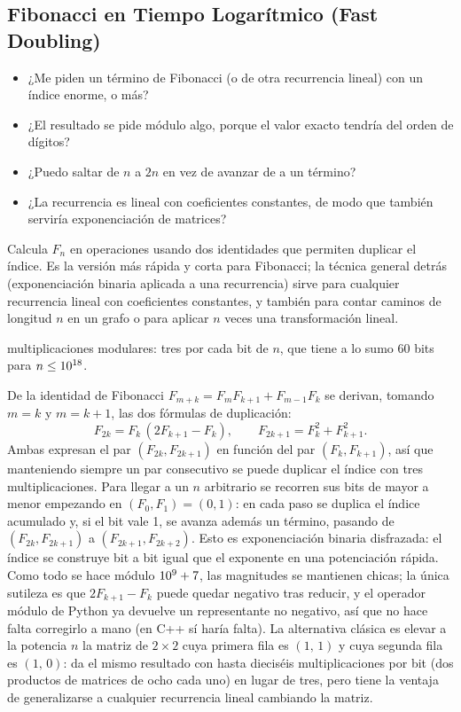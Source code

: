 \subsection{Fibonacci en Tiempo Logarítmico (Fast Doubling)}
\label{alg:7-8}


\begin{itemize}
\item ¿Me piden un término de Fibonacci (o de otra recurrencia lineal) con un índice enorme,  o más?
\item ¿El resultado se pide módulo algo, porque el valor exacto tendría del orden de  dígitos?
\item ¿Puedo saltar de $n$ a $2n$ en vez de avanzar de a un término?
\item ¿La recurrencia es lineal con coeficientes constantes, de modo que también serviría exponenciación de matrices?
\end{itemize}

 Calcula $F_n$ en  operaciones usando dos identidades que permiten duplicar el índice. Es la versión más rápida y corta para Fibonacci; la técnica general detrás (exponenciación binaria aplicada a una recurrencia) sirve para cualquier recurrencia lineal con coeficientes constantes, y también para contar caminos de longitud $n$ en un grafo o para aplicar $n$ veces una transformación lineal.

  multiplicaciones modulares: tres por cada bit de $n$, que tiene a lo sumo 60 bits para $n \le 10^{18}$.

 De la identidad de Fibonacci $F_{m+k} = F_m F_{k+1} + F_{m-1} F_k$ se derivan, tomando $m = k$ y $m = k+1$, las dos fórmulas de duplicación:
\[F_{2k} = F_k\,(2F_{k+1} - F_k), \qquad F_{2k+1} = F_k^2 + F_{k+1}^2.\]
Ambas expresan el par $(F_{2k}, F_{2k+1})$ en función del par $(F_k, F_{k+1})$, así que manteniendo siempre un par consecutivo se puede duplicar el índice con tres multiplicaciones. Para llegar a un $n$ arbitrario se recorren sus bits de mayor a menor empezando en $(F_0, F_1) = (0,1)$: en cada paso se duplica el índice acumulado y, si el bit vale 1, se avanza además un término, pasando de $(F_{2k}, F_{2k+1})$ a $(F_{2k+1}, F_{2k+2})$. Esto es exponenciación binaria disfrazada: el índice se construye bit a bit igual que el exponente en una potenciación rápida. Como todo se hace módulo $10^{9}+7$, las magnitudes se mantienen chicas; la única sutileza es que $2F_{k+1} - F_k$ puede quedar negativo tras reducir, y el operador módulo de Python ya devuelve un representante no negativo, así que no hace falta corregirlo a mano (en C++ sí haría falta). La alternativa clásica es elevar a la potencia $n$ la matriz de $2\times2$ cuya primera fila es $(1,\,1)$ y cuya segunda fila es $(1,\,0)$: da el mismo resultado con hasta dieciséis multiplicaciones por bit (dos productos de matrices de ocho cada uno) en lugar de tres, pero tiene la ventaja de generalizarse a cualquier recurrencia lineal cambiando la matriz.~\cite{knuth1997}

